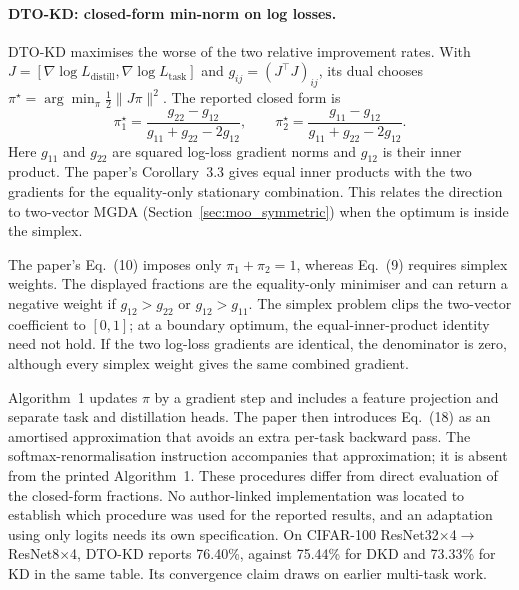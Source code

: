\paragraph{DTO-KD: closed-form min-norm on log losses.}
DTO-KD \citep{hayder2026dtokd} maximises the worse of the two relative improvement rates.
With $J=[\nabla\log L_{\mathrm{distill}},\nabla\log L_{\mathrm{task}}]$ and
$g_{ij}=(J^\top J)_{ij}$, its dual chooses $\pi^\star=\arg\min_\pi\tfrac12\|J\pi\|^2$.
The reported closed form is
\[
\pi_1^\star=\frac{g_{22}-g_{12}}{g_{11}+g_{22}-2g_{12}},\qquad
\pi_2^\star=\frac{g_{11}-g_{12}}{g_{11}+g_{22}-2g_{12}}.
\]
Here $g_{11}$ and $g_{22}$ are squared log-loss gradient norms and $g_{12}$ is their inner product.
The paper's Corollary~3.3 gives equal inner products with the two gradients for the equality-only stationary combination. This relates the direction to two-vector MGDA (Section~\ref{sec:moo_symmetric}) when the optimum is inside the simplex.

The paper's Eq.~(10) imposes only $\pi_1+\pi_2=1$, whereas Eq.~(9) requires simplex weights.
The displayed fractions are the equality-only minimiser and can return a negative weight if
$g_{12}>g_{22}$ or $g_{12}>g_{11}$. The simplex problem clips the two-vector coefficient to $[0,1]$;
at a boundary optimum, the equal-inner-product identity need not hold. If the two log-loss gradients
are identical, the denominator is zero, although every simplex weight gives the same combined gradient.

Algorithm~1 updates $\pi$ by a gradient step and includes a feature projection and separate task and
distillation heads. The paper then introduces Eq.~(18) as an amortised approximation that avoids an extra
per-task backward pass. The softmax-renormalisation instruction accompanies that approximation;
it is absent from the printed Algorithm~1. These procedures differ from direct evaluation of the
closed-form fractions. No author-linked implementation was located to establish which procedure was
used for the reported results, and an adaptation using only logits needs its own specification.
On CIFAR-100 ResNet32$\times$4$\to$ResNet8$\times$4, DTO-KD reports 76.40\%, against 75.44\% for DKD and
73.33\% for KD in the same table. Its convergence claim draws on earlier multi-task work.

